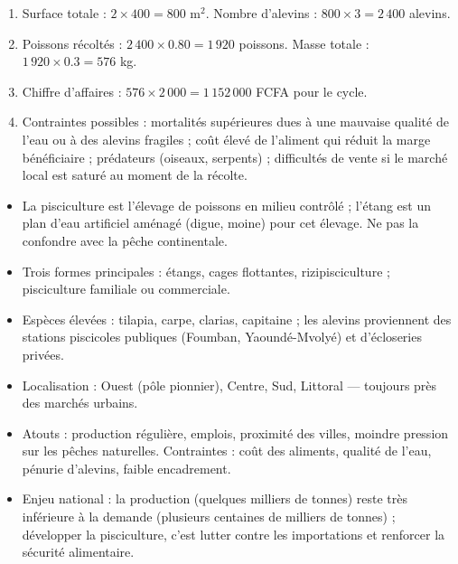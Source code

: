 \documentclass[11pt]{article}
\newcommand{\cle}[1]{{\popxbold\color{popdark}#1}}
\begin{document}
\begin{corrige}
\begin{enumerate}
\item Surface totale : $2 \times 400 = 800$ m$^2$. Nombre d'alevins : $800 \times 3 = 2\,400$ alevins.
\item Poissons récoltés : $2\,400 \times \num{0,80} = 1\,920$ poissons. Masse totale : $1\,920 \times \num{0,3} = 576$ kg.
\item Chiffre d'affaires : $576 \times 2\,000 = 1\,152\,000$ FCFA pour le cycle.
\item Contraintes possibles : mortalités supérieures dues à une mauvaise qualité de l'eau ou à des alevins fragiles ; coût élevé de l'aliment qui réduit la marge bénéficiaire ; prédateurs (oiseaux, serpents) ; difficultés de vente si le marché local est saturé au moment de la récolte.
\end{enumerate}
\end{corrige}

\begin{aretenir}
\begin{itemize}
\item La \cle{pisciculture} est l'élevage de poissons en milieu contrôlé ; l'\cle{étang} est un plan d'eau artificiel aménagé (digue, moine) pour cet élevage. Ne pas la confondre avec la pêche continentale.
\item Trois formes principales : étangs, cages flottantes, rizipisciculture ; pisciculture familiale ou commerciale.
\item Espèces élevées : tilapia, carpe, clarias, capitaine ; les alevins proviennent des stations piscicoles publiques (Foumban, Yaoundé-Mvolyé) et d'écloseries privées.
\item Localisation : Ouest (pôle pionnier), Centre, Sud, Littoral — toujours près des marchés urbains.
\item Atouts : production régulière, emplois, proximité des villes, moindre pression sur les pêches naturelles. Contraintes : coût des aliments, qualité de l'eau, pénurie d'alevins, faible encadrement.
\item Enjeu national : la production (quelques milliers de tonnes) reste très inférieure à la demande (plusieurs centaines de milliers de tonnes) ; développer la pisciculture, c'est lutter contre les importations et renforcer la sécurité alimentaire.
\end{itemize}
\end{aretenir}
\end{document}
